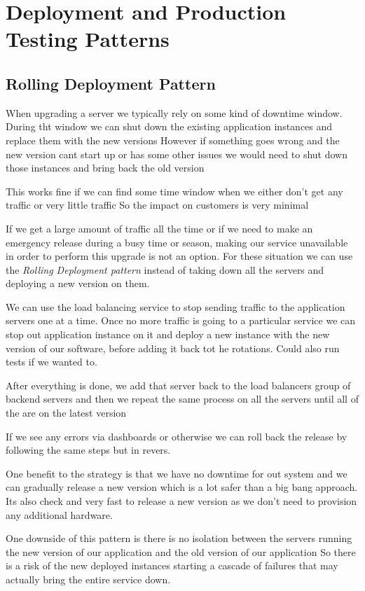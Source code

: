 \section{Deployment and Production Testing Patterns}

\subsection{Rolling Deployment Pattern}
When upgrading a server we typically rely on some kind of downtime window.
During tht window we can shut down the existing application instances and replace them with the new versions
However if something goes wrong and the new version cant start up or has some other issues we would need to shut down those instances and bring back the old version

This works fine if we can find some time window when we either don't get any traffic or very little traffic
So the impact on customers is very minimal

If we get a large amount of traffic all the time or if we need to make an emergency release during a busy time or season, making our service unavailable in order to perform this upgrade is not an option.
For these situation we can use the \textit{Rolling Deployment pattern} instead of taking down all the servers and deploying a new version on them.

We can use the load balancing service to stop sending traffic to the application servers one at a time.
Once no more traffic is going to a particular service we can stop out application instance on it and deploy a new instance with the new version of our software, before adding it back tot he rotations.
Could also run tests if we wanted to.

After everything is done, we add that server back to the load balancers group of backend servers and then we repeat the same process on all the servers until all of the are on the latest version

If we see any errors via dashboards or otherwise we can roll back the release by following the same steps but in revers.

One benefit to the strategy is that we have no downtime for out system and we can gradually release a new version which is a lot safer than a big bang approach.
Its also check and very fast to release a new version as we don't need to provision any additional hardware.

One downside of this pattern is there is no isolation between the servers running the new version of our application and the old version of our application
So there is a risk of the new deployed instances starting a cascade of failures that may actually bring the entire service down.


